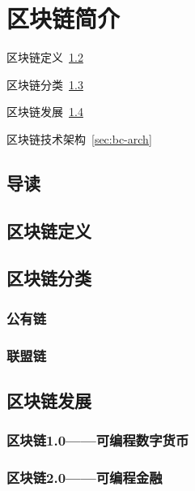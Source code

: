\chapter{区块链简介}

\begin{introduction}
  \item 区块链定义~\ref{sec:bc-def}
  \item 区块链分类~\ref{sec:bc-type}
  \item 区块链发展~\ref{sec:bc-dev}
  \item 区块链技术架构~\ref{sec:bc-arch}
\end{introduction}



\section{导读}


\section{区块链定义}\label{sec:bc-def}



\section{区块链分类}\label{sec:bc-type}

\subsection{公有链}

\subsection{联盟链}

\section{区块链发展}\label{sec:bc-dev}

\subsection{区块链1.0——可编程数字货币}

\subsection{区块链2.0——可编程金融}

